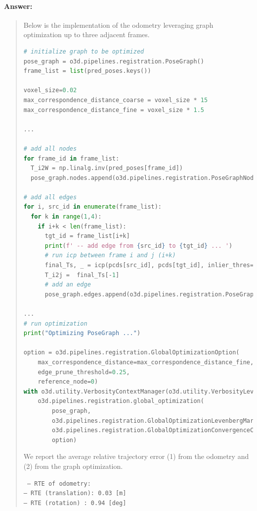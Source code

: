 \documentclass[11pt]{article}
\begin{document}
\paragraph{Answer:} 
\begin{quote}

Below is the implementation of the odometry leveraging graph optimization up to three adjacent frames.

\begin{lstlisting}[language=Python, basicstyle=\scriptsize]
# initialize graph to be optimized
pose_graph = o3d.pipelines.registration.PoseGraph()
frame_list = list(pred_poses.keys())

voxel_size=0.02
max_correspondence_distance_coarse = voxel_size * 15
max_correspondence_distance_fine = voxel_size * 1.5

...

# add all nodes
for frame_id in frame_list:
  T_i2W = np.linalg.inv(pred_poses[frame_id])
  pose_graph.nodes.append(o3d.pipelines.registration.PoseGraphNode(T_i2W))

# add all edges
for i, src_id in enumerate(frame_list):
  for k in range(1,4):
    if i+k < len(frame_list):
      tgt_id = frame_list[i+k]
      print(f' -- add edge from {src_id} to {tgt_id} ... ')
      # run icp between frame i and j (i+k)
      final_Ts, _ = icp(pcds[src_id], pcds[tgt_id], inlier_thres=0.01)
      T_i2j =  final_Ts[-1]
      # add an edge
      pose_graph.edges.append(o3d.pipelines.registration.PoseGraphEdge(i, i+k, T_i2j))

...
# run optimization
print("Optimizing PoseGraph ...")

option = o3d.pipelines.registration.GlobalOptimizationOption(
    max_correspondence_distance=max_correspondence_distance_fine,
    edge_prune_threshold=0.25,
    reference_node=0)
with o3d.utility.VerbosityContextManager(o3d.utility.VerbosityLevel.Debug) as cm:
    o3d.pipelines.registration.global_optimization(
        pose_graph,
        o3d.pipelines.registration.GlobalOptimizationLevenbergMarquardt(),
        o3d.pipelines.registration.GlobalOptimizationConvergenceCriteria(),
        option)

\end{lstlisting}

We report the average relative trajectory error (1) from the odometry and (2) from the graph optimization.

{\tt
-- RTE of odometry:                 \\
-- RTE (translation): 0.03 [m]      \\
-- RTE (rotation)   : 0.94 [deg]    
}


\end{quote}
\end{document}
